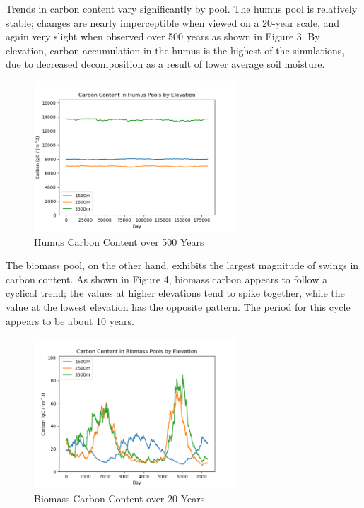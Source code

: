 \documentclass[12pt, letterpaper]{article}
\begin{document}
Trends in carbon content vary significantly by pool. The humus pool is relatively stable; changes are nearly imperceptible when viewed on a 20-year scale, and again very slight when observed over 500 years as shown in Figure 3. By elevation, carbon accumulation in the humus is the highest of the simulations, due to decreased decomposition as a result of lower average soil moisture.

\begin{figure}[hp]
    \centering
    \includegraphics[width=0.67\textwidth]{humus500years.png}
    \caption{Humus Carbon Content over 500 Years}
    \label{fig:my_label}
\end{figure}

The biomass pool, on the other hand, exhibits the largest magnitude of swings in carbon content. As shown in Figure 4, biomass carbon appears to follow a cyclical trend; the values at higher elevations tend to spike together, while the value at the lowest elevation has the opposite pattern. The period for this cycle appears to be about 10 years.

\begin{figure}[hp]
    \centering
    \includegraphics[width=0.67\textwidth]{biomass20years.png}
    \caption{Biomass Carbon Content over 20 Years}
    \label{fig:my_label}
\end{figure}
\end{document}
